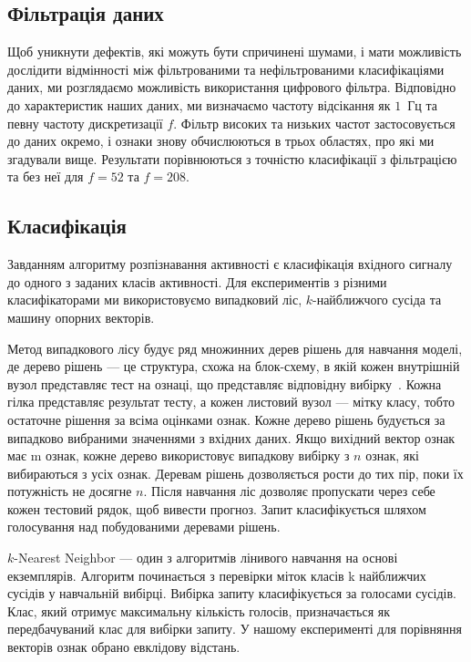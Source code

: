 \documentclass[]{iptconf}
\begin{document}
\subsection{Фільтрація даних}

Щоб уникнути дефектів, які можуть бути спричинені шумами, і мати можливість дослідити відмінності між фільтрованими та нефільтрованими класифікаціями даних, ми розглядаємо можливість використання цифрового фільтра. Відповідно до характеристик наших даних, ми визначаємо частоту відсікання як $1$~Гц та певну частоту дискретизації $f$. Фільтр високих та низьких частот застосовується до даних окремо, і ознаки знову обчислюються в трьох областях, про які ми згадували вище. Результати порівнюються з точністю класифікації з фільтрацією та без неї для $f=52$ та $f=208$.


\subsection{Класифікація}

Завданням алгоритму розпізнавання активності є класифікація вхідного сигналу до одного з заданих класів активності. Для експериментів з різними класифікаторами ми використовуємо випадковий ліс, $k$-найближчого сусіда та машину опорних векторів.

Метод випадкового лісу будує ряд множинних дерев рішень для навчання моделі, де дерево рішень --- це структура, схожа на блок-схему, в якій кожен внутрішній вузол представляє тест на ознаці, що представляє відповідну вибірку~\cite{10}. Кожна гілка представляє результат тесту, а кожен листовий вузол --- мітку класу, тобто остаточне рішення за всіма оцінками ознак. Кожне дерево рішень будується за випадково вибраними значеннями з вхідних даних. Якщо вихідний вектор ознак має m ознак, кожне дерево використовує випадкову вибірку з $n$ ознак, які вибираються з усіх ознак. Деревам рішень дозволяється рости до тих пір, поки їх потужність не досягне $n$. Після навчання ліс дозволяє пропускати через себе кожен тестовий рядок, щоб вивести прогноз. Запит класифікується шляхом голосування над побудованими деревами рішень.

$k$-Nearest Neighbor --- один з алгоритмів лінивого навчання на основі екземплярів. Алгоритм починається з перевірки міток класів k найближчих сусідів у навчальній вибірці. Вибірка запиту класифікується за голосами сусідів. Клас, який отримує максимальну кількість голосів, призначається як передбачуваний клас для вибірки запиту. У нашому експерименті для порівняння векторів ознак обрано евклідову відстань.
\end{document}
